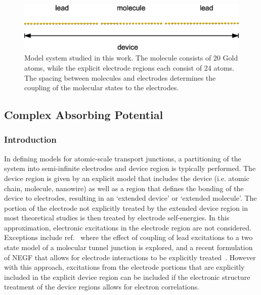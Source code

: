\begin{figure}
	\begin{center}
		\includegraphics[width=0.9\linewidth]{figures/figure1}
	\end{center}
	\caption{Model system studied in this work. The molecule consists of
        20 Gold atoms, while the explicit electrode regions each consist of 24
	atoms. The spacing between molecules and electrodes determines the
	coupling of the molecular states to the electrodes.}
	\label{fig:chaincapdevice}
\end{figure}

\subsection{Complex Absorbing Potential}
\label{subsec:CAP}

\subsubsection{Introduction}
In defining models for atomic-scale transport junctions, a partitioning
of the system into semi-infinite electrodes and device region is typically
performed. The device region is given by an explicit model that includes
the device (i.e. atomic chain, molecule, nanowire) as well as a region
that defines the bonding of the device to electrodes, resulting in an
`extended device' or `extended molecule'. The portion of the
electrode not explicitly treated by the extended device region in
most theoretical studies is then treated by electrode self-energies. In this
approximation, electronic excitations in the electrode region are not
considered. Exceptions include ref.~\cite{galperin_nitzan2006leadexcitations}
where the effect of coupling of lead excitations to a two state model of
a molecular tunnel junction is explored, and a recent formulation
of \ac{NEGF} that allows for electrode interactions to be explicitly
treated~\cite{ness2012jpa_leadnegf}. However with this approach, excitations
from the electrode portions that are explicitly included in the explicit
device region can be included if the electronic structure treatment of
the device regions allows for electron correlations.

